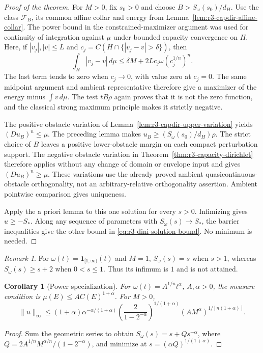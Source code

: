 \documentclass[11pt,a4paper]{article}
\numberwithin{equation}{section}
\newtheorem{corollary}[theorem]{Corollary}
\theoremstyle{definition}
\theoremstyle{remark}
\newtheorem{remark}[theorem]{Remark}
\begin{document}
\begin{proof}[Proof of the theorem]
For $M>0$, fix $s_0>0$ and choose $B>S_\omega(s_0)/d_H$.
Use the class $\mathcal F_B$, its common affine collar and energy
from Lemma~\ref{lem:r3-capdir-affine-collar}. The power bound in
the constrained-maximizer argument was used for continuity of
integration against $\mu$ under bounded capacity convergence on
$H$. Here, if $|v_j|,|v|\leq L$ and
$c_j=C(H\cap\{|v_j-v|>\delta\})$, then
\[
 \int_H|v_j-v|\,d\mu
 \leq\delta M+2L c_j\omega(c_j^{1/n})^n.
\]
The last term tends to zero when $c_j\to0$, with value zero at
$c_j=0$. The same midpoint argument and ambient representative
therefore give a maximizer of the energy minus $\int v\,d\mu$.
The test $tB\rho$ again proves that it is not the zero function,
and the classical strong maximum principle makes it strictly negative.

The positive obstacle variation of
Lemma~\ref{lem:r3-capdir-upper-variation} yields $(Du_B)^n\leq\mu$.
The preceding lemma makes $u_B\geq(S_\omega(s_0)/d_H)\rho$.
The strict choice of $B$ leaves a positive lower-obstacle margin
on each compact perturbation support. The negative obstacle
variation in Theorem~\ref{thm:r3-capacity-dirichlet} therefore
applies without any change of domain or envelope input and gives
$(Du_B)^n\geq\mu$. These variations use the already proved ambient
quasicontinuous-obstacle orthogonality, not an arbitrary-relative
orthogonality assertion. Ambient pointwise comparison gives uniqueness.

Apply the a priori lemma to this one solution for every $s>0$.
Infimizing gives $u\geq-S_*$. Along any sequence of parameters
with $S_\omega(s)\to S_*$, the barrier inequalities give the
other bound in \eqref{eq:r3-dini-solution-bound}. No minimum is needed.
\end{proof}

\begin{remark}
For $\omega(t)=\mathbf1_{[1,\infty)}(t)$ and $M=1$,
$S_\omega(s)=s$ when $s>1$, whereas $S_\omega(s)\geq s+2$
when $0<s\leq1$. Thus its infimum is $1$ and is not attained.
\end{remark}

\begin{corollary}[Power specialization]
\label{cor:r3-dini-power-specialization}
For $\omega(t)=A^{1/n}t^\alpha$, $A,\alpha>0$, the measure
condition is $\mu(E)\leq A C(E)^{1+\alpha}$. For $M>0$,
\[
 \|u\|_\infty\leq
 (1+\alpha)\alpha^{-\alpha/(1+\alpha)}
 \left(\frac2{1-2^{-\alpha}}\right)^{1/(1+\alpha)}
 (AM^\alpha)^{1/[n(1+\alpha)]}.
\]
\end{corollary}
\begin{proof}
Sum the geometric series to obtain $S_\omega(s)=s+Qs^{-\alpha}$,
where $Q=2A^{1/n}M^{\alpha/n}/(1-2^{-\alpha})$, and minimize at
$s=(\alpha Q)^{1/(1+\alpha)}$.
\end{proof}
\end{document}
